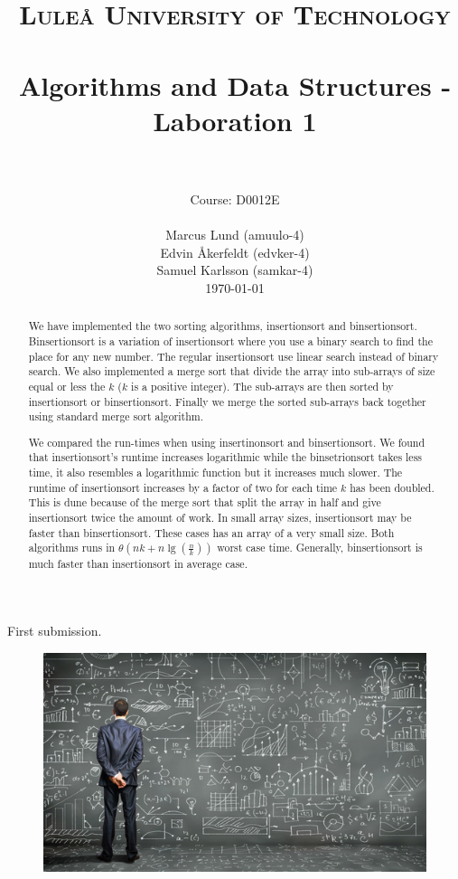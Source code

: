 \documentclass[paper=a4, fontsize=11pt]{scrartcl}
\title{
		\usefont{OT1}{bch}{b}{n}
		\normalfont \normalsize \textsc{Luleå University of Technology} \\ [25pt]
		\horrule{0.5pt} \\[0.4cm]
		\huge Algorithms and Data Structures - Laboration 1 \\
		\horrule{2pt} \\[0.5cm]
}
\author{Course: D0012E \\ \\ 
		\normalfont 								\normalsize
        Marcus Lund (amuulo-4) \\\normalfont\normalsize Edvin Åkerfeldt (edvker-4)\\\normalfont\normalsize Samuel Karlsson (samkar-4)\\[-3pt]		\normalsize
        \today
}
\date{}
\numberwithin{equation}{section}		%
\numberwithin{figure}{section}			%
\numberwithin{table}{section}				%
\begin{document}
\maketitle
\centerline{First submission.}
\begin{figure}[h!]
  \centering
    \includegraphics[width=1\textwidth]{algorithm}
\end{figure}
\newpage

\begin{abstract}
We have implemented the two sorting algorithms, insertionsort and binsertionsort. Binsertionsort is a variation of insertionsort where you use a binary search to find the place for any new number. The regular insertionsort use linear search instead of binary search. We also implemented a merge sort that divide the array into sub-arrays of size equal or less the $k$ ($k$ is a positive integer). The sub-arrays are then sorted by insertionsort or binsertionsort. Finally we merge the sorted sub-arrays back together using standard merge sort algorithm.

We compared the run-times when using insertinonsort and binsertionsort. We found that insertionsort's runtime increases logarithmic while the binsetrionsort takes less time, it also resembles a logarithmic function but it increases much slower. 
The runtime of insertionsort increases by a factor of two for each time $k$ has been doubled. This is dune because of the merge sort that split the array in half and give insertionsort twice the amount of work. In small array sizes, insertionsort may be faster than binsertionsort. These cases has an array of a very small size. Both algorithms runs in $\theta(nk + n\lg(\frac{n}{k}))$ worst case time. Generally, binsertionsort is much faster than insertionsort in average case.

\end{abstract}
\end{document}
